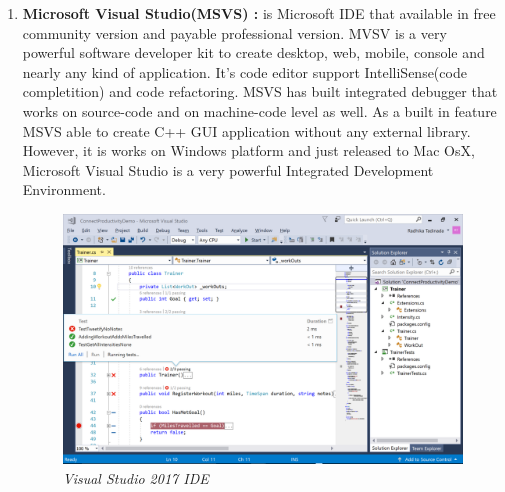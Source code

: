 \documentclass[12pt]{article}
\begin{document}
{{\begin{enumerate}
It does not include  a debugger for native code, but it provide debugger plug-in that acts interface between the IDE and the external debugger to debug C++ code. Supported debuggers are :
\begin{enumerate}
\item GNU debugger (GDB)
\item LLVM debugger (LLDB)
\item Microsoft Console Debugger (CDB)
\item Internal Javascript Debugger
\end{enumerate}

Supported platforms : 
\begin{enumerate}
\item Linux
\item Windows
\item MacOS
\end{enumerate}

\item \textbf{Microsoft Visual Studio(MSVS) : } is Microsoft IDE that available in free community version and payable professional version. MVSV is a very powerful software developer kit to create desktop, web, mobile, console and nearly any kind of application. It's code editor support IntelliSense(code completition) and code refactoring. MSVS has built integrated debugger that works on source-code and on machine-code level as well. As a built in feature MSVS able to create C++ GUI application without any external library. However, it is works on Windows platform and just released to Mac OsX, Microsoft Visual Studio is a very powerful Integrated Development Environment.\cite{VS}\\

\begin{figure}[h!]
\centering
\includegraphics[scale=0.5]{Pictures/visualStudio.png}
\caption{\textit{\color{gray}Visual Studio 2017 IDE \cite{visualstudio}}}
\end{figure}




\end{enumerate}}}
\end{document}
